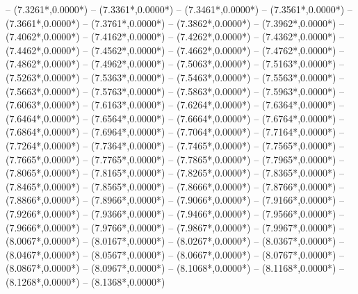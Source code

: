 {	-- ({7.3261*\dx},{0.0000*\dy})
	-- ({7.3361*\dx},{0.0000*\dy})
	-- ({7.3461*\dx},{0.0000*\dy})
	-- ({7.3561*\dx},{0.0000*\dy})
	-- ({7.3661*\dx},{0.0000*\dy})
	-- ({7.3761*\dx},{0.0000*\dy})
	-- ({7.3862*\dx},{0.0000*\dy})
	-- ({7.3962*\dx},{0.0000*\dy})
	-- ({7.4062*\dx},{0.0000*\dy})
	-- ({7.4162*\dx},{0.0000*\dy})
	-- ({7.4262*\dx},{0.0000*\dy})
	-- ({7.4362*\dx},{0.0000*\dy})
	-- ({7.4462*\dx},{0.0000*\dy})
	-- ({7.4562*\dx},{0.0000*\dy})
	-- ({7.4662*\dx},{0.0000*\dy})
	-- ({7.4762*\dx},{0.0000*\dy})
	-- ({7.4862*\dx},{0.0000*\dy})
	-- ({7.4962*\dx},{0.0000*\dy})
	-- ({7.5063*\dx},{0.0000*\dy})
	-- ({7.5163*\dx},{0.0000*\dy})
	-- ({7.5263*\dx},{0.0000*\dy})
	-- ({7.5363*\dx},{0.0000*\dy})
	-- ({7.5463*\dx},{0.0000*\dy})
	-- ({7.5563*\dx},{0.0000*\dy})
	-- ({7.5663*\dx},{0.0000*\dy})
	-- ({7.5763*\dx},{0.0000*\dy})
	-- ({7.5863*\dx},{0.0000*\dy})
	-- ({7.5963*\dx},{0.0000*\dy})
	-- ({7.6063*\dx},{0.0000*\dy})
	-- ({7.6163*\dx},{0.0000*\dy})
	-- ({7.6264*\dx},{0.0000*\dy})
	-- ({7.6364*\dx},{0.0000*\dy})
	-- ({7.6464*\dx},{0.0000*\dy})
	-- ({7.6564*\dx},{0.0000*\dy})
	-- ({7.6664*\dx},{0.0000*\dy})
	-- ({7.6764*\dx},{0.0000*\dy})
	-- ({7.6864*\dx},{0.0000*\dy})
	-- ({7.6964*\dx},{0.0000*\dy})
	-- ({7.7064*\dx},{0.0000*\dy})
	-- ({7.7164*\dx},{0.0000*\dy})
	-- ({7.7264*\dx},{0.0000*\dy})
	-- ({7.7364*\dx},{0.0000*\dy})
	-- ({7.7465*\dx},{0.0000*\dy})
	-- ({7.7565*\dx},{0.0000*\dy})
	-- ({7.7665*\dx},{0.0000*\dy})
	-- ({7.7765*\dx},{0.0000*\dy})
	-- ({7.7865*\dx},{0.0000*\dy})
	-- ({7.7965*\dx},{0.0000*\dy})
	-- ({7.8065*\dx},{0.0000*\dy})
	-- ({7.8165*\dx},{0.0000*\dy})
	-- ({7.8265*\dx},{0.0000*\dy})
	-- ({7.8365*\dx},{0.0000*\dy})
	-- ({7.8465*\dx},{0.0000*\dy})
	-- ({7.8565*\dx},{0.0000*\dy})
	-- ({7.8666*\dx},{0.0000*\dy})
	-- ({7.8766*\dx},{0.0000*\dy})
	-- ({7.8866*\dx},{0.0000*\dy})
	-- ({7.8966*\dx},{0.0000*\dy})
	-- ({7.9066*\dx},{0.0000*\dy})
	-- ({7.9166*\dx},{0.0000*\dy})
	-- ({7.9266*\dx},{0.0000*\dy})
	-- ({7.9366*\dx},{0.0000*\dy})
	-- ({7.9466*\dx},{0.0000*\dy})
	-- ({7.9566*\dx},{0.0000*\dy})
	-- ({7.9666*\dx},{0.0000*\dy})
	-- ({7.9766*\dx},{0.0000*\dy})
	-- ({7.9867*\dx},{0.0000*\dy})
	-- ({7.9967*\dx},{0.0000*\dy})
	-- ({8.0067*\dx},{0.0000*\dy})
	-- ({8.0167*\dx},{0.0000*\dy})
	-- ({8.0267*\dx},{0.0000*\dy})
	-- ({8.0367*\dx},{0.0000*\dy})
	-- ({8.0467*\dx},{0.0000*\dy})
	-- ({8.0567*\dx},{0.0000*\dy})
	-- ({8.0667*\dx},{0.0000*\dy})
	-- ({8.0767*\dx},{0.0000*\dy})
	-- ({8.0867*\dx},{0.0000*\dy})
	-- ({8.0967*\dx},{0.0000*\dy})
	-- ({8.1068*\dx},{0.0000*\dy})
	-- ({8.1168*\dx},{0.0000*\dy})
	-- ({8.1268*\dx},{0.0000*\dy})
	-- ({8.1368*\dx},{0.0000*\dy})
}

